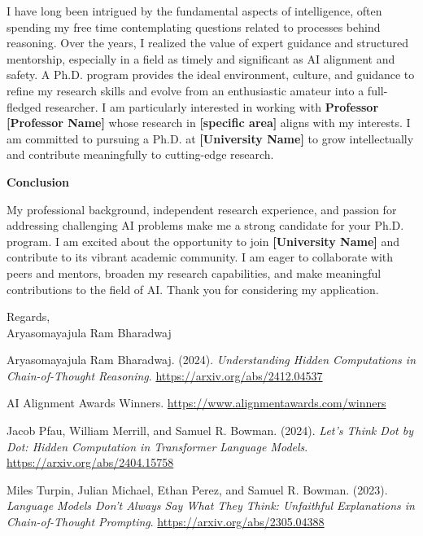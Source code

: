 \documentclass[12pt]{article}
\begin{document}
I have long been intrigued by the fundamental aspects of intelligence, often spending my free time contemplating questions related to  processes behind reasoning. Over the years, I realized the value of expert guidance and structured mentorship, especially in a field as timely and significant as AI alignment and safety. A Ph.D. program provides the ideal environment, culture, and guidance to refine my research skills and evolve from an enthusiastic amateur into a full-fledged researcher. I am particularly interested in working with \textbf{Professor [Professor Name]} whose research in \textbf{[specific area]} aligns with my interests. I am committed to pursuing a Ph.D. at \textbf{[University Name]} to grow intellectually and contribute meaningfully to cutting-edge research.

\textbf{Conclusion}

My professional background, independent research experience, and passion for addressing challenging AI problems make me a strong candidate for your Ph.D. program. I am excited about the opportunity to join \textbf{[University Name]} and contribute to its vibrant academic community. I am eager to collaborate with peers and mentors, broaden my research capabilities, and make meaningful contributions to the field of AI. Thank you for considering my application.

Regards,\\
Aryasomayajula Ram Bharadwaj

\newpage
\begin{thebibliography}{9}

Aryasomayajula Ram Bharadwaj. (2024). \emph{Understanding Hidden Computations in Chain-of-Thought Reasoning}.  
\url{https://arxiv.org/abs/2412.04537}

AI Alignment Awards Winners.  
\url{https://www.alignmentawards.com/winners}

Jacob Pfau, William Merrill, and Samuel R. Bowman. (2024). \emph{Let's Think Dot by Dot: Hidden Computation in Transformer Language Models}.  
\url{https://arxiv.org/abs/2404.15758}

Miles Turpin, Julian Michael, Ethan Perez, and Samuel R. Bowman. (2023). \emph{Language Models Don't Always Say What They Think: Unfaithful Explanations in Chain-of-Thought Prompting}.  
\url{https://arxiv.org/abs/2305.04388}

\end{thebibliography}
\end{document}

